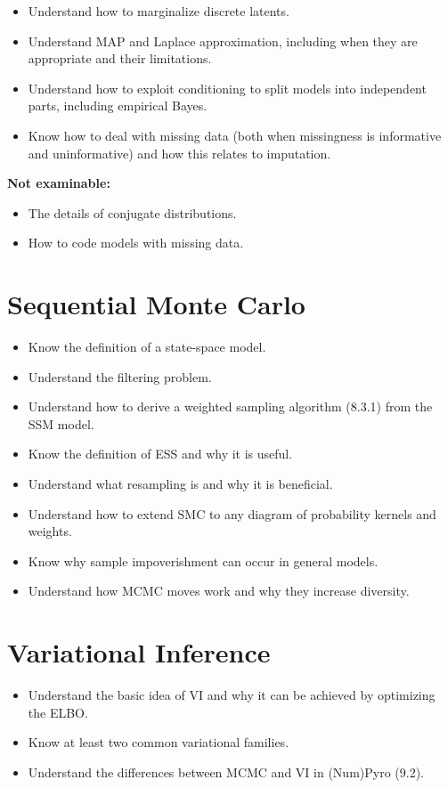 \documentclass[11pt, a4paper]{article}
\newcommand{\notexaminable}[1]{%
  \begin{notebox}
    \footnotesize\textbf{Not examinable:}\vspace{2pt}
    \begin{itemize}[topsep=1pt, itemsep=1pt, leftmargin=1.2em]
      #1
    \end{itemize}
  \end{notebox}%
}
\begin{document}
\begin{itemize}
  \item Understand how to marginalize discrete latents.
  \item Understand MAP and Laplace approximation, including when they are appropriate and their limitations.
  \item Understand how to exploit conditioning to split models into independent parts, including empirical Bayes.
  \item Know how to deal with missing data (both when missingness is informative and uninformative) and how this relates to imputation.
\end{itemize}

\notexaminable{
  \item The details of conjugate distributions.
  \item How to code models with missing data.
}

\section{Sequential Monte Carlo}

\begin{itemize}
  \item Know the definition of a state-space model.
  \item Understand the filtering problem.
  \item Understand how to derive a weighted sampling algorithm (8.3.1) from the SSM model.
  \item Know the definition of ESS and why it is useful.
  \item Understand what resampling is and why it is beneficial.
  \item Understand how to extend SMC to any diagram of probability kernels and weights.
  \item Know why sample impoverishment can occur in general models.
  \item Understand how MCMC moves work and why they increase diversity.
\end{itemize}

\section{Variational Inference}

\begin{itemize}
  \item Understand the basic idea of VI and why it can be achieved by optimizing the ELBO.
  \item Know at least two common variational families.
  \item Understand the differences between MCMC and VI in (Num)Pyro (9.2).
\end{itemize}
\end{document}
